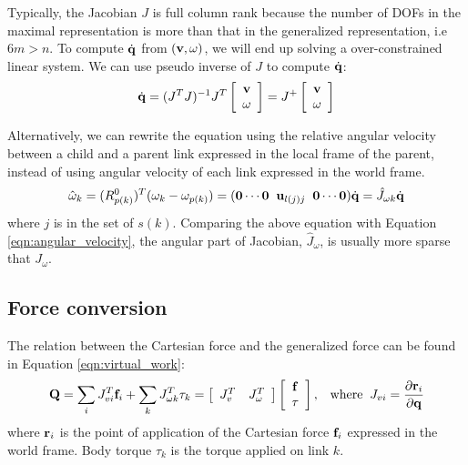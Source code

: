 Typically, the Jacobian $J$ is full column rank because the
number of DOFs in the maximal representation is more than that in the
generalized representation, i.e $6m > n$. To compute $\dot{\mathbf{q}}$ from $(\mathbf{v}, \omega)$, we
will end up solving a over-constrained linear system. We can use
pseudo inverse of $J$ to compute $\dot{\mathbf{q}}$:
\begin{equation}
 \dot{\mathbf{q}} = (J^TJ)^{-1}J^T
\left[
\begin{array}{c}
\mathbf{v} \\
\omega
\end{array}
\right]
 = J^+
\left[
\begin{array}{c}
\mathbf{v} \\
\omega
\end{array}
\right]
\end{equation}

Alternatively, we can rewrite the equation using the relative angular
velocity between a child and a parent link expressed in the local
frame of the parent, instead of using angular velocity of each link
expressed in the world frame.
\begin{equation}
\hat{\omega}_k = (R^0_{p(k)})^T(\omega_k - \omega_{p(k)}) = (\mathbf{0} \cdots \mathbf{0} \;\; \mathbf{u}_{l(j)j} \;\; \mathbf{0}
\cdots \mathbf{0}) \dot{\mathbf{q}} = \hat{J}_{\omega k} \dot{\mathbf{q}} 
\end{equation}
where $j$ is in the set of $s(k)$. Comparing the above equation with Equation \ref{eqn:angular_velocity},
the angular part of Jacobian, $\hat{J}_\omega$, is usually more sparse
that $J_\omega$.


\subsection{Force conversion}
The relation between the Cartesian force and the generalized force can
be found in Equation \ref{eqn:virtual_work}:
\begin{equation}
\label{eqn:force_conversion}
\mathbf{Q} = \sum_i J_{vi}^T \mathbf{f}_i + \sum_k J_{\omega k}^T \tau_k = 
\left[
\begin{array}{cc}
J_{v}^T & J_\omega^T
\end{array}
\right]
\left[
\begin{array}{c}
\mathbf{f} \\
\tau
\end{array}
\right] 
, \;\;\;\mathrm{where}\;\;
J_{vi} = \frac{\partial \mathbf{r}_i}{\partial \mathbf{q}}
\end{equation}
where $\mathbf{r}_i$ is the point of application of the Cartesian force
$\mathbf{f}_i$ expressed in the world frame. Body torque $\tau_k$ is the torque
applied on link $k$. 

